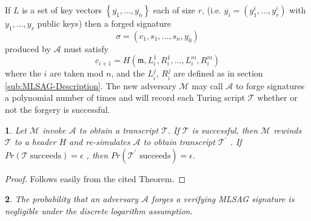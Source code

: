 \documentclass[12pt,oneside,english]{amsart}
\numberwithin{equation}{section}
\numberwithin{figure}{section}
\theoremstyle{plain}
\newtheorem{thm}{\protect\theoremname}
\theoremstyle{plain}
\newtheorem{lem}[thm]{\protect\lemmaname}
\theoremstyle{remark}
\theoremstyle{plain}
\theoremstyle{remark}
\theoremstyle{remark}
\theoremstyle{plain}
\theoremstyle{definition}
\providecommand{\lemmaname}{Lemma}
\providecommand{\theoremname}{Theorem}
\begin{document}
If $L$ is a set of key vectors $\left\{ \overline{y_{1}},...,\overline{y_{n}}\right\} $
each of size $r$, (i.e. $\overline{y_{i}}=\left(y_{1}^{i},...,y_{r}^{i}\right)$
with $y_{1},...,y_{r}$ public keys) then a forged signature 
\[
\sigma=\left(c_{1},s_{1},...,s_{n},y_{0}\right)
\]
 produced by $\mathcal{A}$ must satisfy 
\[
c_{i+1}=H\left(\mathfrak{m},L_{i}^{1},R_{i}^{1},...,L_{i}^{m},R_{i}^{m}\right)
\]
 where the $i$ are taken mod $n$, and the $L_{i}^{j}$, $R_{i}^{j}$
are defined as in section \ref{sub:MLSAG-Description}. The new adversary $\mathcal{M}$
may call $\mathcal{A}$ to forge signatures a polynomial number of
times and will record each Turing script $\mathcal{T}$ whether
or not the forgery is successful. 
\begin{lem}
\label{lem:RewindingLemma}\cite[Lemma 1]{LWW} %
{} Let $\mathcal{M}$ invoke $\mathcal{A}$ to obtain a transcript $\mathcal{T}.$
If $\mathcal{T}$ is successful, then $\mathcal{M}$ rewinds $\mathcal{T}$
to a header $H$ and re-simulates $\mathcal{A}$ to obtain transcript
$\mathcal{T}^{\prime}$ . If $Pr\left(\mathcal{T}\ \mbox{succeeds}\right)=\epsilon$
, then $Pr\left(\mathcal{T}^{\prime}\mbox{ succeeds}\right)=\epsilon.$ \end{lem}
\begin{proof}
Follows easily from the cited Theorem. \end{proof}
\begin{thm}
\label{thm:Unforgeability}The probability that an adversary $\mathcal{A}$
forges a verifying MLSAG signature is negligible under the discrete
logarithm assumption. 
\end{thm}
\end{document}
